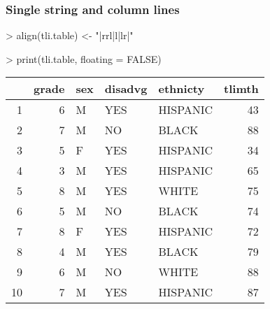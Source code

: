 \documentclass[letterpaper]{article}
\begin{document}
\subsubsection{Single string and column lines}
\begin{Schunk}
\begin{Sinput}
> align(tli.table) <- "|rrl|l|lr|"
\end{Sinput}
\end{Schunk}
\begin{Schunk}
\begin{Sinput}
> print(tli.table, floating = FALSE)
\end{Sinput}
% latex table generated in R 2.6.0 by xtable 1.5-2 package
% Wed Oct 10 14:26:37 2007
\begin{tabular}{|rrl|l|lr|}
  \hline
 & grade & sex & disadvg & ethnicty & tlimth \\
  \hline
1 &   6 & M & YES & HISPANIC &  43 \\
  2 &   7 & M & NO & BLACK &  88 \\
  3 &   5 & F & YES & HISPANIC &  34 \\
  4 &   3 & M & YES & HISPANIC &  65 \\
  5 &   8 & M & YES & WHITE &  75 \\
  6 &   5 & M & NO & BLACK &  74 \\
  7 &   8 & F & YES & HISPANIC &  72 \\
  8 &   4 & M & YES & BLACK &  79 \\
  9 &   6 & M & NO & WHITE &  88 \\
  10 &   7 & M & YES & HISPANIC &  87 \\
   \hline
\end{tabular}\end{Schunk}
\end{document}
